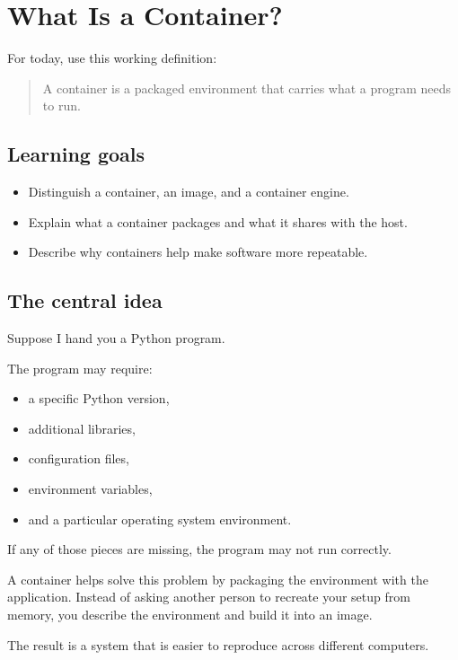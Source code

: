 \chapter{What Is a Container?}
\label{chap:what-is-a-container}

For today, use this working definition:

\begin{quote}
A container is a packaged environment that carries what a program needs to run.
\end{quote}

\section{Learning goals}
\begin{itemize}
  \item Distinguish a container, an image, and a container engine.
  \item Explain what a container packages and what it shares with the host.
  \item Describe why containers help make software more repeatable.
\end{itemize}

\section{The central idea}

Suppose I hand you a Python program.

The program may require:

\begin{itemize}
  \item a specific Python version,
  \item additional libraries,
  \item configuration files,
  \item environment variables,
  \item and a particular operating system environment.
\end{itemize}

If any of those pieces are missing, the program may not run correctly.

A container helps solve this problem by packaging the environment with the application. Instead of asking another person to recreate your setup from memory, you describe the environment and build it into an image.

The result is a system that is easier to reproduce across different computers.

